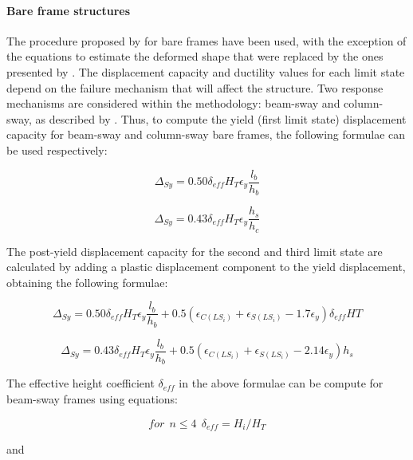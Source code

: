 \paragraph{Bare frame structures}

The procedure  proposed by \citep{Crowleyetal2006} for bare frames have been used, with the exception of the equations to estimate the deformed shape that were replaced by the ones presented by \citep{Priestleyetal2007}. The displacement capacity and ductility values for each limit state depend on the failure mechanism that will affect the structure. Two response mechanisms are considered within the methodology: beam-sway and column-sway, as described by \citet{PaulayPriestley1992}. Thus, to compute the yield (first limit state) displacement capacity for beam-sway and column-sway bare frames, the following formulae can be used respectively:

\begin{equation}
\Delta_{Sy}=0.50\delta_{eff}H_T\epsilon_y\frac{l_b}{h_b}
\end{equation}

\begin{equation}
\Delta_{Sy}=0.43\delta_{eff}H_T\epsilon_y\frac{h_s}{h_c}
\end{equation}

The post-yield displacement capacity for the second and third limit state are calculated by adding a plastic displacement component to the yield displacement, obtaining the following formulae:

\begin{equation}
\Delta_{Sy}=0.50\delta_{eff}H_T\epsilon_y\frac{l_b}{h_b}+0.5(\epsilon_{C\left({LS_i}\right)}+\epsilon_{S\left({LS_i}\right)}-1.7\epsilon_y)\delta_{eff}HT
\end{equation}

\begin{equation}
\Delta_{Sy}=0.43\delta_{eff}H_T\epsilon_y\frac{l_b}{h_b}+0.5(\epsilon_{C\left({LS_i}\right)}+\epsilon_{S\left({LS_i}\right)}-2.14\epsilon_y)h_s
\end{equation}

The effective height coefficient  $\delta_{eff}$ in the above formulae can be compute for beam-sway frames using equations: 

\begin{equation}
for \ \ n\leq 4 \ \ \delta_{eff}=H_i/H_T
\end{equation}

and

